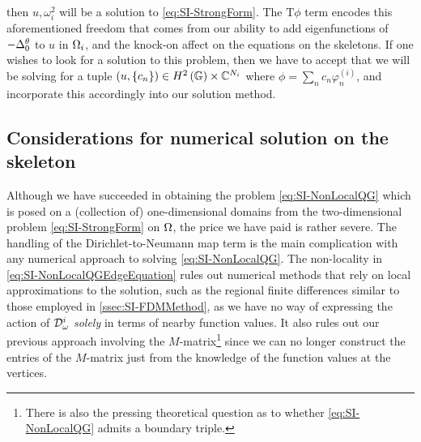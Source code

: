 then $u, \omega_i^2$ will be a solution to \eqref{eq:SI-StrongForm}.
The $\mathrm{T}\phi$ term encodes this aforementioned freedom that comes from our ability to add eigenfunctions of $-\Delta^\theta_0$ to $u$ in $\Omega_i$, and the knock-on affect on the equations on the skeletons.
If one wishes to look for a solution to this problem, then we have to accept that we will be solving for a tuple $\left( u, \left\{ c_n \right\} \right)\in H^2\left( \mathbb{G} \right)\times\mathbb{C}^{N_i}$ where $\phi=\sum_n c_n\varphi^{(i)}_n$, and incorporate this accordingly into our solution method.

\subsection{Considerations for numerical solution on the skeleton} \label{ssec:SI-GraphMethod}
Although we have succeeded in obtaining the problem \eqref{eq:SI-NonLocalQG} which is posed on a (collection of) one-dimensional domains from the two-dimensional problem \eqref{eq:SI-StrongForm} on $\Omega$, the price we have paid is rather severe.
The handling of the Dirichlet-to-Neumann map term is the main complication with any numerical approach to solving \eqref{eq:SI-NonLocalQG}.
The non-locality in \eqref{eq:SI-NonLocalQGEdgeEquation} rules out numerical methods that rely on local approximations to the solution, such as the regional finite differences similar to those employed in \ref{ssec:SI-FDMMethod}, as we have no way of expressing the action of $\mathcal{D}^i_\omega$ \emph{solely} in terms of nearby function values.
It also rules out our previous approach involving the $M$-matrix\footnote{There is also the pressing theoretical question as to whether \eqref{eq:SI-NonLocalQG} admits a boundary triple.} since we can no longer construct the entries of the $M$-matrix just from the knowledge of the function values at the vertices.

